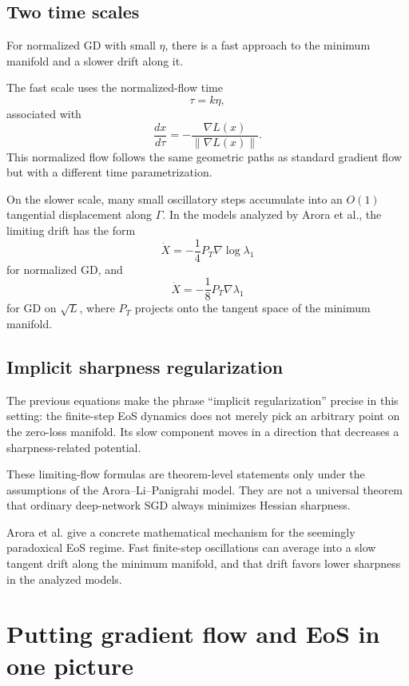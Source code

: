 \documentclass[11pt,a4paper,oneside,openany]{memoir}
\theoremstyle{definition}
\begin{document}
\section{Two time scales}
For normalized GD with small $\eta$, there is a fast approach to the minimum manifold and a slower drift along it.

The fast scale uses the normalized-flow time
\[
\tau=k\eta,
\]
associated with
\[
\frac{dx}{d\tau}=-\frac{\nabla L(x)}{\|\nabla L(x)\|}.
\]
This normalized flow follows the same geometric paths as standard gradient flow but with a different time parametrization.

On the slower scale, many small oscillatory steps accumulate into an $O(1)$ tangential displacement along $\Gamma$.  In the models analyzed by Arora et al., the limiting drift has the form
\[
\dot X=-\frac14 P_T\nabla\log\lambda_1
\]
for normalized GD, and
\[
\dot X=-\frac18 P_T\nabla\lambda_1
\]
for GD on $\sqrt L$, where $P_T$ projects onto the tangent space of the minimum manifold.

\section{Implicit sharpness regularization}
The previous equations make the phrase ``implicit regularization'' precise in this setting: the finite-step EoS dynamics does not merely pick an arbitrary point on the zero-loss manifold.  Its slow component moves in a direction that decreases a sharpness-related potential.

\begin{warningbox}
These limiting-flow formulas are theorem-level statements only under the assumptions of the Arora--Li--Panigrahi model.  They are not a universal theorem that ordinary deep-network SGD always minimizes Hessian sharpness.
\end{warningbox}

\begin{presentbox}
Arora et al. give a concrete mathematical mechanism for the seemingly paradoxical EoS regime.  Fast finite-step oscillations can average into a slow tangent drift along the minimum manifold, and that drift favors lower sharpness in the analyzed models.
\end{presentbox}

\chapter{Putting gradient flow and EoS in one picture}
\end{document}
